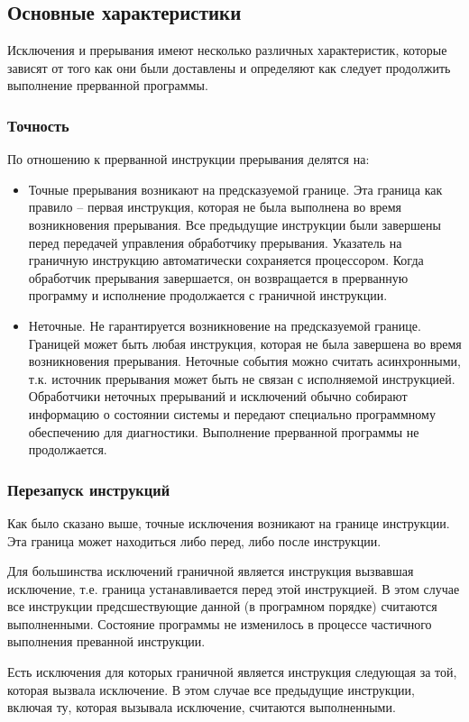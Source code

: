 \subsection{Основные характеристики}
Исключения и прерывания имеют несколько различных характеристик, которые
зависят от того как они были доставлены и определяют как следует продолжить выполнение
прерванной программы.

\subsubsection*{Точность}
По отношению к прерванной инструкции прерывания делятся на:
\begin{itemize}
\item Точные прерывания возникают на предсказуемой границе. Эта граница
как правило -- первая инструкция, которая не была выполнена во время
возникновения прерывания. Все предыдущие инструкции были завершены перед
передачей управления обработчику прерывания. Указатель на граничную инструкцию
автоматически сохраняется процессором. Когда обработчик прерывания
завершается, он возвращается в прерванную программу и исполнение продолжается
с граничной инструкции.
\item Неточные. Не гарантируется возникновение на предсказуемой границе.
Границей может быть любая инструкция, которая не была завершена во время
возникновения прерывания. Неточные события можно считать асинхронными, т.к.
источник прерывания может быть не связан с исполняемой инструкцией.
Обработчики неточных прерываний и исключений обычно собирают информацию о
состоянии системы и передают специально программному обеспечению для
диагностики. Выполнение прерванной программы не продолжается.
\end{itemize}

\subsubsection*{Перезапуск инструкций}
Как было сказано выше, точные исключения возникают на границе инструкции. Эта
граница может находиться либо перед, либо после инструкции.

Для большинства исключений граничной является инструкция вызвавшая исключение,
т.е. граница устанавливается перед этой инструкцией. В этом случае все
инструкции предсшествующие данной (в програмном порядке) считаются
выполненными. Состояние программы не изменилось в процессе частичного
выполнения преванной инструкции.

Есть исключения для которых граничной является инструкция следующая за той,
которая вызвала исключение. В этом случае все предыдущие инструкции, включая
ту, которая вызывала исключение, считаются выполненными.

